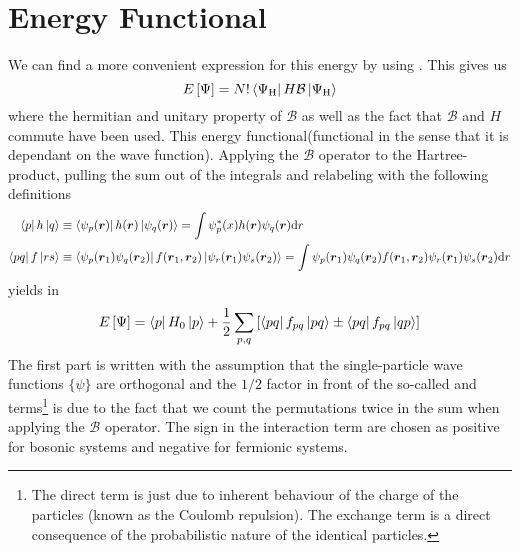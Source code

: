 \section{Energy Functional\label{sec:energyFunc}}
    We can find a more convenient expression for this energy by using
    . This gives us
        \begin{equation}
            E\left[\Psi\right] =
            N!\bra{\Psi_{\text{H}}}H\mathcal{B}\ket{\Psi_{\text{H}}}
        \end{equation}
    where the hermitian and unitary property of $\mathcal{B}$ as well as the
    fact that $\mathcal{B}$ and $H$ commute have been used. This energy
    functional(functional in the sense that it is dependant on the wave
    function). Applying the $\mathcal{B}$ operator to the Hartree-product,
    pulling the sum out of the integrals and relabeling with the following
    definitions
        \begin{equation}
            \begin{aligned}
                \bra{p}h\ket{q} &\equiv
                \bra{\psi_p(\boldsymbol{{r}})}h(\boldsymbol{{r}})\ket{\psi_q(\boldsymbol{{r}})} =
                \int\psi^{*}_p(x)h(\boldsymbol{{r}})\psi_q(\boldsymbol{{r}})\mathrm{d} r \\
                \bra{pq}f\ket{rs} &\equiv
                \bra{\psi_p(\boldsymbol{{r}}_1)\psi_q(\boldsymbol{{r}}_2)}
                f(\boldsymbol{{r}}_1,\boldsymbol{{r}}_2)
                \ket{\psi_r(\boldsymbol{{r}}_1)\psi_s(\boldsymbol{{r}}_2)} = \int
                \psi_p(\boldsymbol{{r}}_1)\psi_q(\boldsymbol{{r}}_2) f(\boldsymbol{{r}}_1,\boldsymbol{{r}}_2)
                \psi_r(\boldsymbol{{r}}_1)\psi_s(\boldsymbol{{r}}_2) \mathrm{d} r
            \end{aligned}
        \end{equation}
    yields in
        \begin{equation}
            E\left[\Psi\right] = \bra{p}H_0\ket{p} +
            \frac{1}{2}\sum_{p,q}\left[\bra{pq}f_{pq}\ket{pq} \pm
            \bra{pq}f_{pq}\ket{qp}\right]
            \label{eq:ch3Efunc}
        \end{equation}
    The first part is written with the assumption that the single-particle wave
    functions $\{\psi\}$ are orthogonal and the $1/2$ factor in front of the
    so-called  and  terms\footnote{The direct
    term is just due to inherent behaviour of the charge of the particles
    (known as the Coulomb repulsion). The exchange term is a direct consequence
    of the probabilistic nature of the identical particles.} is due to the fact
    that we count the permutations twice in the sum when applying the
    $\mathcal{B}$ operator. The sign in the interaction term are chosen as
    positive for bosonic systems and negative for fermionic systems.

